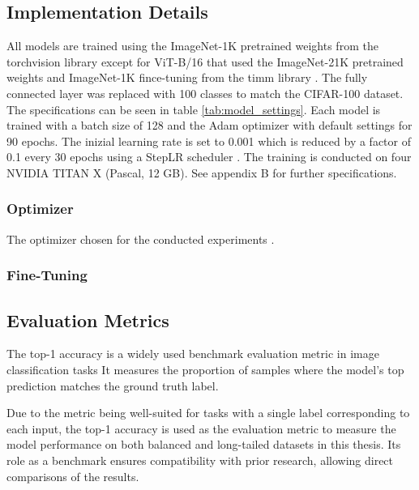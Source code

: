 \subsection{Implementation Details}
All models are trained using the ImageNet-1K pretrained weights from the torchvision library \cite{torchvision-resnet,pytorch_mobilenetv2,torchvision2024convnextbase} except for ViT-B/16 that used the ImageNet-21K pretrained weights and ImageNet-1K fince-tuning from the timm library \cite{huggingface2024vitbase}. The fully connected layer was replaced with 100 classes to match the CIFAR-100 dataset. The specifications can be seen in table \ref{tab:model_settings}. Each model is trained with a batch size of 128 and the Adam optimizer \cite{kingma2017adammethodstochasticoptimization} with default settings for 90 epochs. The inizial learning rate is set to 0.001 which is reduced by a factor of 0.1 every 30 epochs using a StepLR scheduler \cite{pytorch_steplr}. The training is conducted on four NVIDIA TITAN X (Pascal, 12 GB). See appendix B  for further specifications.

\subsubsection{Optimizer}
The optimizer chosen for the conducted experiments
 \cite{menon2021longtaillearninglogitadjustment,loshchilov2018fixing}. 

\subsubsection{Fine-Tuning}



\subsection{Evaluation Metrics}
The top-1 accuracy is a widely used benchmark evaluation metric in image classification tasks \cite{zhang2023deep}  It measures the proportion of samples where the model's top prediction matches the ground truth label.

Due to the metric being well-suited for tasks with a single label corresponding to each input, the top-1 accuracy is used as the evaluation metric to measure the model performance on both balanced and long-tailed datasets in this thesis. Its role as a benchmark ensures compatibility with prior research, allowing direct comparisons of the results.

